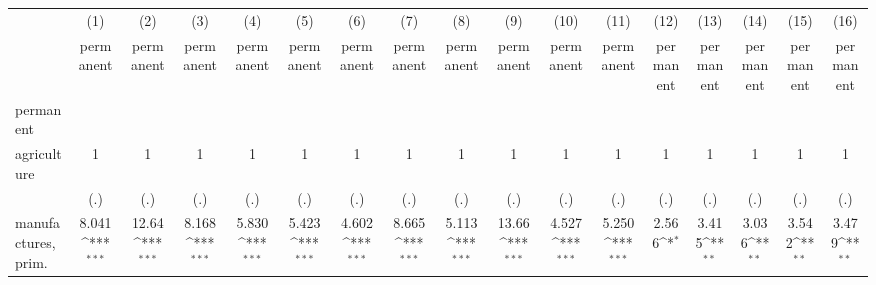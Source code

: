 {
\def\sym#1{\ifmmode^{#1}\else\(^{#1}\)\fi}
\begin{tabular}{l*{16}{c}}
\hline\hline
                    &\multicolumn{1}{c}{(1)}&\multicolumn{1}{c}{(2)}&\multicolumn{1}{c}{(3)}&\multicolumn{1}{c}{(4)}&\multicolumn{1}{c}{(5)}&\multicolumn{1}{c}{(6)}&\multicolumn{1}{c}{(7)}&\multicolumn{1}{c}{(8)}&\multicolumn{1}{c}{(9)}&\multicolumn{1}{c}{(10)}&\multicolumn{1}{c}{(11)}&\multicolumn{1}{c}{(12)}&\multicolumn{1}{c}{(13)}&\multicolumn{1}{c}{(14)}&\multicolumn{1}{c}{(15)}&\multicolumn{1}{c}{(16)}\\
                    &\multicolumn{1}{c}{permanent}&\multicolumn{1}{c}{permanent}&\multicolumn{1}{c}{permanent}&\multicolumn{1}{c}{permanent}&\multicolumn{1}{c}{permanent}&\multicolumn{1}{c}{permanent}&\multicolumn{1}{c}{permanent}&\multicolumn{1}{c}{permanent}&\multicolumn{1}{c}{permanent}&\multicolumn{1}{c}{permanent}&\multicolumn{1}{c}{permanent}&\multicolumn{1}{c}{permanent}&\multicolumn{1}{c}{permanent}&\multicolumn{1}{c}{permanent}&\multicolumn{1}{c}{permanent}&\multicolumn{1}{c}{permanent}\\
\hline
permanent           &                     &                     &                     &                     &                     &                     &                     &                     &                     &                     &                     &                     &                     &                     &                     &                     \\
agriculture         &           1         &           1         &           1         &           1         &           1         &           1         &           1         &           1         &           1         &           1         &           1         &           1         &           1         &           1         &           1         &           1         \\
                    &         (.)         &         (.)         &         (.)         &         (.)         &         (.)         &         (.)         &         (.)         &         (.)         &         (.)         &         (.)         &         (.)         &         (.)         &         (.)         &         (.)         &         (.)         &         (.)         \\
[1em]
manufactures, prim. &       8.041\sym{***}&       12.64\sym{***}&       8.168\sym{***}&       5.830\sym{***}&       5.423\sym{***}&       4.602\sym{***}&       8.665\sym{***}&       5.113\sym{***}&       13.66\sym{***}&       4.527\sym{***}&       5.250\sym{***}&       2.566\sym{*}  &       3.415\sym{**} &       3.036\sym{**} &       3.542\sym{**} &       3.479\sym{**} \\

\end{tabular}}
